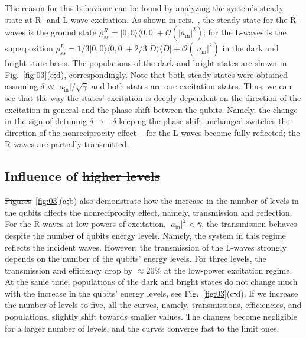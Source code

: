 \documentclass[lettersize,journal]{IEEEtran}
\providecommand{\DIFaddtex}[1]{{\protect\color{blue}\uwave{#1}}} %
\providecommand{\DIFdeltex}[1]{{\protect\color{red}\sout{#1}}}                      %
\providecommand{\DIFaddbegin}{} %
\providecommand{\DIFaddend}{} %
\providecommand{\DIFdelbegin}{} %
\providecommand{\DIFdelend}{} %
\providecommand{\DIFadd}[1]{\texorpdfstring{\DIFaddtex{#1}}{#1}} %
\providecommand{\DIFdel}[1]{\texorpdfstring{\DIFdeltex{#1}}{}} %
\newcommand{\DIFscaledelfig}{0.5}
\newlength{\DIFdelgraphicswidth} %
\newlength{\DIFdelgraphicsheight} %
\newcommand{\DIFaddincludegraphics}[2][]{{\color{blue}\fbox{\DIFOincludegraphics[#1]{#2}}}} %
\newcommand{\DIFdelincludegraphics}[2][]{%
\sbox{\DIFdelgraphicsbox}{\DIFOincludegraphics[#1]{#2}}%
\settoboxwidth{\DIFdelgraphicswidth}{\DIFdelgraphicsbox} %
\settoboxtotalheight{\DIFdelgraphicsheight}{\DIFdelgraphicsbox} %
\scalebox{\DIFscaledelfig}{%
\parbox[b]{\DIFdelgraphicswidth}{\usebox{\DIFdelgraphicsbox}\\[-\baselineskip] \rule{\DIFdelgraphicswidth}{0em}}\llap{\resizebox{\DIFdelgraphicswidth}{\DIFdelgraphicsheight}{%
\setlength{\unitlength}{\DIFdelgraphicswidth}%
\begin{picture}(1,1)%
\thicklines\linethickness{2pt} %
{\color[rgb]{1,0,0}\put(0,0){\framebox(1,1){}}}%
{\color[rgb]{1,0,0}\put(0,0){\line( 1,1){1}}}%
{\color[rgb]{1,0,0}\put(0,1){\line(1,-1){1}}}%
\end{picture}%
}\hspace*{3pt}}} %
} %
\DeclareRobustCommand{\DIFaddbegin}{\DIFOaddbegin \let\includegraphics\DIFaddincludegraphics} %
\DeclareRobustCommand{\DIFaddend}{\DIFOaddend \let\includegraphics\DIFOincludegraphics} %
\DeclareRobustCommand{\DIFdelbegin}{\DIFOdelbegin \let\includegraphics\DIFdelincludegraphics} %
\DeclareRobustCommand{\DIFdelend}{\DIFOaddend \let\includegraphics\DIFOincludegraphics} %
\begin{document}
The reason for this behaviour can be found by analyzing the system's steady state at R- and L-wave excitation.
As shown in refs.~\cite{muller_nonreciprocal_2017, rosario_hamann_rectangular_2019, Nefedkin2022}, the steady state for the R-waves is the ground state $\rho_{ss}^R = |0,0\rangle \langle0,0| + \mathcal{O}(|a_\mathrm{in}|^2)$; for the L-waves is the superposition $\rho_{ss}^L = 1/3 |0,0\rangle \langle0,0| + 2/3 |D \rangle \langle D| + \mathcal{O}(|a_\mathrm{in}|^2)$ in the dark and bright state basis.
The populations of the dark and bright states are shown in Fig.~\ref{fig:03}(c\DIFdelbegin \DIFdel{,}\DIFdelend \DIFaddbegin \DIFadd{) and (}\DIFaddend d), correspondingly.
Note that both steady states were obtained assuming $\delta \ll |a_\mathrm{in}|/\sqrt{\bar{\gamma}}$ and both states are one-excitation states.
Thus, we can see that the way the states' excitation is deeply dependent on the direction of the excitation in general and the phase shift between the qubits.
Namely, the change in the sign of detuning $\delta \rightarrow - \delta$ keeping the phase shift unchanged switches the direction of the nonreciprocity effect -- for the L-waves become fully reflected; the R-waves are partially transmitted.

\subsection{Influence of \DIFdelbegin \DIFdel{higher levels}\DIFdelend \DIFaddbegin \DIFadd{Higher Levels}\DIFaddend }

\DIFdelbegin \DIFdel{Figures}\DIFdelend \DIFaddbegin \DIFadd{Fig.}\DIFaddend ~\ref{fig:03}(a\DIFdelbegin \DIFdel{,}\DIFdelend \DIFaddbegin \DIFadd{) and (}\DIFaddend b) also demonstrate how the increase in the number of levels in the qubits affects the nonreciprocity effect, namely, transmission and reflection.
For the R-waves at low powers of excitation, $|a_\mathrm{in}|^2 < \bar{\gamma}$, the transmission behaves despite the number of qubits energy levels.
Namely, the system in this regime reflects the incident waves.
However, the transmission of the L-waves strongly depends on the number of the qubits' energy levels.
For three levels, the transmission and efficiency drop by $\approx 20 \%$ at the low-power excitation regime.
At the same time, populations of the dark and bright states do not change much with the increase in the qubits' energy levels, see Fig.~\ref{fig:03}(c\DIFdelbegin \DIFdel{,}\DIFdelend \DIFaddbegin \DIFadd{) and (}\DIFaddend d).
If we increase the number of levels to five, all the curves, namely, transmissions, efficiencies, and populations, slightly shift towards smaller values.
The changes become negligible for a larger number of levels, and the curves converge fast to the limit ones.
\end{document}
